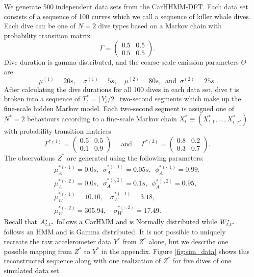 We generate 500 independent data sets from the CarHHMM-DFT. Each data set consists of a sequence of 100 curves which we call a sequence of killer whale dives. Each dive can be one of $N=2$ dive types based on a Markov chain with probability transition matrix
%
$$\Gamma = \begin{pmatrix} 0.5 & 0.5 \\ 0.5 & 0.5 \end{pmatrix}.$$
%
Dive duration is gamma distributed, and the coarse-scale emission parameters $\Theta$ are
$$
    \mu^{(1)} = 20s, \quad \sigma^{(1)} = 5s, \quad
    \mu^{(2)} = 80s, \enspace \text{and} \enspace \sigma^{(2)} = 25s.
$$
%
After calculating the dive durations for all 100 dives in each data set, dive $t$ is broken into a sequence of $T^*_t = \lfloor Y_t/2 \rfloor$ two-second segments which make up the fine-scale hidden Markov model. Each two-second segment is assigned one of $N^*=2$ behaviours according to a fine-scale Markov chain $X^*_t \equiv \left(X^*_{t,1}, \ldots, X^*_{t,T^*_t} \right)$ with probability transition matrices
%
$$\Gamma^{*(1)} = \begin{pmatrix} 0.5 & 0.5 \\ 0.1 & 0.9 \end{pmatrix} \quad \text{ and } \quad \Gamma^{*(2)} = \begin{pmatrix} 0.8 & 0.2 \\ 0.3 & 0.7 \end{pmatrix}.$$ 
%
The observations $Z^*$ are generated using the following parameters:
%
\begin{gather*}
    \mu_A^{*(\cdot,1)} = 0.0 s, \enspace \sigma_A^{*(\cdot,1)} = 0.05s, \enspace \phi_A^{*(\cdot,1)} = 0.99, \\
    \mu_A^{*(\cdot,2)} = 0.0 s, \enspace \sigma_A^{*(\cdot,2)} = 0.1s, \enspace \phi_A^{*(\cdot,2)} = 0.95, \\
    \mu_W^{*(\cdot,1)} = 10.10, \quad \sigma_W^{*(\cdot,1)} = 3.18, \\
    \mu_W^{*(\cdot,2)} = 305.94, \quad \sigma_W^{*(\cdot,2)} = 17.49.
\end{gather*}
%
Recall that $A^*_{t,t^*}$ follows a CarHMM and is Normally distributed while $W^*_{t,t^*}$ follows an HMM and is Gamma distributed. It is not possible to uniquely recreate the raw accelerometer data $Y^*$ from $Z^*$ alone, but we describe one possible mapping from $Z^*$ to $Y^*$ in the appendix. Figure \ref{fig:sim_data} shows this reconstructed sequence along with one realization of $Z^*$ for five dives of one simulated data set. 

